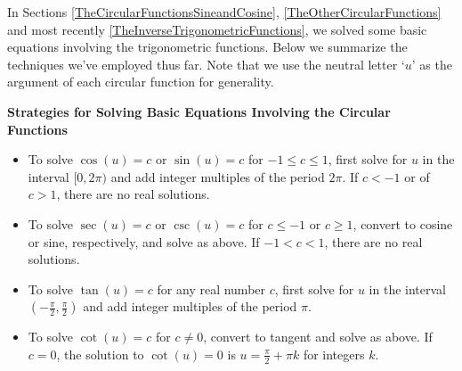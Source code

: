 \documentclass{ximera}
\begin{document}
	\author{Stitz-Zeager}




\setcounter{footnote}{0}

\label{TrigonometricEquationsandInequalities}

In Sections \ref{TheCircularFunctionsSineandCosine}, \ref{TheOtherCircularFunctions} and most recently \ref{TheInverseTrigonometricFunctions}, we solved some basic equations involving the trigonometric functions. Below we summarize the techniques we've employed thus far.  Note that we use the neutral letter `$u$' as the argument of each circular function for generality.

 

\label{trigeqnstrategy1}

\centerline{\textbf{Strategies for Solving Basic Equations Involving the Circular Functions}}

 

\begin{itemize}

\item To solve $\cos(u) = c$ or $\sin(u) = c$ for $-1 \leq c \leq 1$, first solve for $u$ in the interval $[0,2\pi)$ and add integer multiples of the period $2\pi$.  If $c < -1$ or of $c > 1$, there are no real solutions.

\item To solve $\sec(u) = c$ or $\csc(u) = c$ for $c \leq -1$ or $c \geq 1$,  convert to cosine or sine, respectively, and solve as above.  If $-1 < c < 1$, there are no real solutions.

\item To solve  $\tan(u) = c$ for any real number $c$,  first solve for $u$ in the interval $\left(-\frac{\pi}{2}, \frac{\pi}{2}\right)$ and add integer multiples of the period $\pi$.

\item  To solve  $\cot(u) = c$ for $c \neq 0$, convert to tangent and solve as above.  If $c = 0$, the solution to $\cot(u) = 0$ is $u = \frac{\pi}{2} + \pi k$ for integers $k$.

\end{itemize}

 


 
\end{document}
